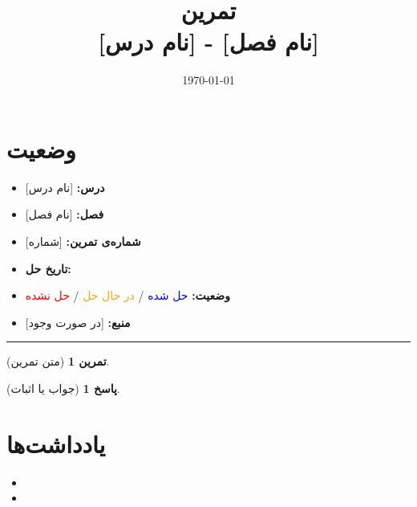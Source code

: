 \documentclass[a4paper,12pt]{article}
\title{%
	\Huge \textbf{تمرین} \\[0.3cm]
	\Large [نام درس] - [نام فصل]
}
\author{\lr{Ali Ashouri}}
\date{\today}
\theoremstyle{exercise}
\newtheorem{exercise}{تمرین}
\newtheorem{solution}{پاسخ}
\begin{document}
	
	\maketitle
	
	\section*{وضعیت}
	\begin{itemize}
		\item \textbf{درس:} [نام درس]
		\item \textbf{فصل:} [نام فصل]
		\item \textbf{شماره‌ی تمرین:} [شماره]
		\item \textbf{تاریخ حل:} 
		\item \textbf{وضعیت:} \textcolor{blue}{حل شده} / \textcolor{orange}{در حال حل} / \textcolor{red}{حل نشده}
		\item \textbf{منبع:} [در صورت وجود]
	\end{itemize}
	\rule{\textwidth}{0.4pt}
	
	\begin{exercise}
		[متن تمرین]
	\end{exercise}

	\bigskip
	
	\begin{solution}
		[جواب یا اثبات]
	\end{solution}
	
	\section*{یادداشت‌ها}
	\begin{itemize}
		\item [یادداشت اول]
		\item [یادداشت دوم]
	\end{itemize}
	
\end{document}
